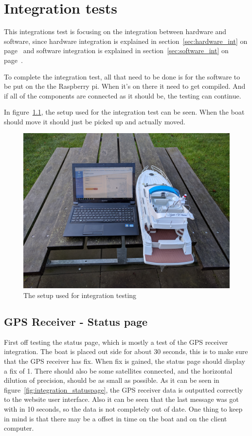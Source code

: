 \chapter{Integration tests}

This integrations test is focusing on the integration between hardware and software, since hardware integration is explained in section~\ref{sec:hardware_int} on page~\pageref{sec:hardware_int} and software integration is explained in section~\ref{sec:software_int} on page~\pageref{sec:software_int}. 

To complete the integration test, all that need to be done is for the software to be put on the the Raspberry pi. When it's on there it need to get compiled. And if all of the components are connected as it should be, the testing can continue. 

In figure~\ref{fig:integration_setup}, the setup used for the integration test can be seen. When the boat should move it should just be picked up and actually moved.

\begin{figure}[H]
\centering
\includegraphics[width=0.7\linewidth]{Images/Integration/setup}
\caption{The setup used for integration testing}
\label{fig:integration_setup}
\end{figure}


\section{GPS Receiver - Status page}
First off testing the status page, which is mostly a test of the GPS receiver integration. The boat is placed out side for about 30 seconds, this is to make sure that the GPS receiver has fix. When fix is gained, the status page should display a fix of 1. There should also be some satellites connected, and the horizontal dilution of precision, should be as small as possible. As it can be seen in figure~\ref{fig:integration_statuspage}, the GPS receiver data is outputted correctly to the website user interface. Also it can be seen that the last message was got with in 10 seconds, so the data is not completely out of date. One thing to keep in mind is that there may be a offset in time on the boat and on the client computer.

